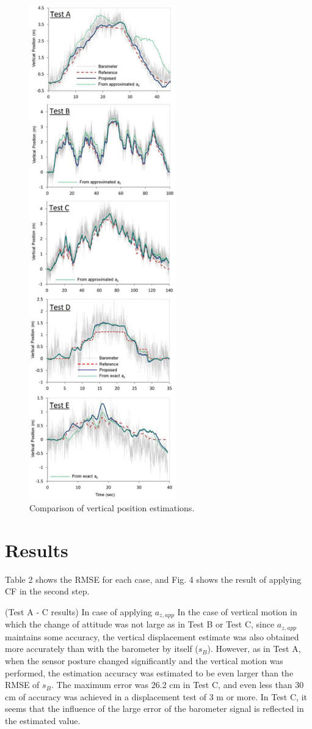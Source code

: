 \documentclass[10pt,journal,compsoc]{IEEEtran}
\begin{document}
\begin{figure}[!t]
\centering
\includegraphics[width=2.5in]{fig4}
\caption{Comparison of vertical position estimations.}
\label{fig4}
\end{figure}


\section{Results}

Table 2 shows the RMSE for each case, and Fig. 4 shows the result of applying CF in the second step.

(Test A - C results) In case of applying $a_{z,app}$ In the case of vertical
motion in which the change of attitude was not large as in Test B or Test C,
since $a_{z,app}$ maintains some accuracy, the vertical displacement estimate
was also obtained more accurately than with the barometer by itself ($s_B$).
However, as in Test A, when the sensor posture changed significantly and the
vertical motion was performed, the estimation accuracy was estimated to be even
larger than the RMSE of $s_B$. The maximum error was 26.2 cm in Test C, and
even less than 30 cm of accuracy was achieved in a displacement test of 3 m or
more. In Test C, it seems that the influence of the large error of the
barometer signal is reflected in the estimated value.
\end{document}
